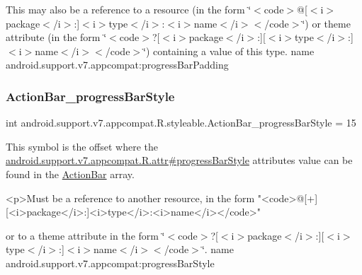 This may also be a reference to a resource (in the form \char`\"{}$<$code$>$@\mbox{[}$<$i$>$package$<$/i$>$\+:\mbox{]}$<$i$>$type$<$/i$>$\+:$<$i$>$name$<$/i$>$$<$/code$>$\char`\"{}) or theme attribute (in the form \char`\"{}$<$code$>$?\mbox{[}$<$i$>$package$<$/i$>$\+:\mbox{]}\mbox{[}$<$i$>$type$<$/i$>$\+:\mbox{]}$<$i$>$name$<$/i$>$$<$/code$>$\char`\"{}) containing a value of this type.  name android.\+support.\+v7.\+appcompat\+:progress\+Bar\+Padding \mbox{\label{classandroid_1_1support_1_1v7_1_1appcompat_1_1R_1_1styleable_abad5be4f45f4786c801289bba4a89a4c}} 
\subsubsection{\texorpdfstring{Action\+Bar\+\_\+progress\+Bar\+Style}{ActionBar\_progressBarStyle}}
{\footnotesize\ttfamily int android.\+support.\+v7.\+appcompat.\+R.\+styleable.\+Action\+Bar\+\_\+progress\+Bar\+Style = 15\hspace{0.3cm}{\ttfamily [static]}}

This symbol is the offset where the \hyperlink{classandroid_1_1support_1_1v7_1_1appcompat_1_1R_1_1attr_abd2e9f1977b38a07341c90beac08fe98}{android.\+support.\+v7.\+appcompat.\+R.\+attr\#progress\+Bar\+Style} attribute\textquotesingle{}s value can be found in the \hyperlink{classandroid_1_1support_1_1v7_1_1appcompat_1_1R_1_1styleable_a5941dc15714398e9ec9afaa0155cc1cf}{Action\+Bar} array.

\begin{DoxyVerb}      <p>Must be a reference to another resource, in the form "<code>@[+][<i>package</i>:]<i>type</i>:<i>name</i></code>"
\end{DoxyVerb}
 or to a theme attribute in the form \char`\"{}$<$code$>$?\mbox{[}$<$i$>$package$<$/i$>$\+:\mbox{]}\mbox{[}$<$i$>$type$<$/i$>$\+:\mbox{]}$<$i$>$name$<$/i$>$$<$/code$>$\char`\"{}.  name android.\+support.\+v7.\+appcompat\+:progress\+Bar\+Style \mbox{\label{classandroid_1_1support_1_1v7_1_1appcompat_1_1R_1_1styleable_ae46a2e4e5897b33e577ca1249abd9c75}} 
